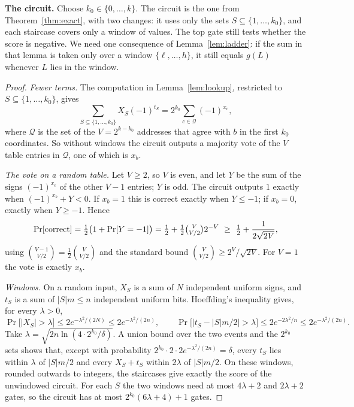 \documentclass[11pt,letterpaper]{article}
\theoremstyle{remark}
\newcommand{\smalltitle}[1]{\textbf{\color{ink}#1}\quad}
\begin{document}
\smalltitle{The circuit.}
Choose $k_0\in\{0,\dots,k\}$. The circuit is the one from
Theorem~\ref{thm:exact}, with two changes: it uses only the sets
$S\subseteq\{1,\dots,k_0\}$, and each staircase covers only a window of
values. The top gate still tests whether the score is negative. We need one
consequence of Lemma~\ref{lem:ladder}: if the sum in that lemma is taken only
over a window $\{\ell,\dots,h\}$, it still equals $g(L)$ whenever $L$ lies in
the window.

\begin{proof}
\emph{Fewer terms.} The computation in Lemma~\ref{lem:lookup}, restricted to
$S\subseteq\{1,\dots,k_0\}$, gives
\[
\sum_{S\subseteq\{1,\dots,k_0\}}X_S(-1)^{t_S}=2^{k_0}\sum_{c\in\mathcal Q}(-1)^{x_c},
\]
where $\mathcal Q$ is the set of the $V=2^{k-k_0}$ addresses that agree with
$b$ in the first $k_0$ coordinates. So without windows the circuit outputs a
majority vote of the $V$ table entries in $\mathcal Q$, one of which is
$x_b$.

\emph{The vote on a random table.} Let $V\ge2$, so $V$ is even, and let $Y$
be the sum of the signs $(-1)^{x_c}$ of the other $V-1$ entries; $Y$ is odd.
The circuit outputs $1$ exactly when $(-1)^{x_b}+Y<0$. If $x_b=1$ this is
correct exactly when $Y\le-1$; if $x_b=0$, exactly when $Y\ge-1$. Hence
\[
\Pr[\text{correct}]=\tfrac12\bigl(1+\Pr[Y=-1]\bigr)
=\tfrac12+\tfrac12\tbinom{V}{V/2}2^{-V}\ \ge\ \tfrac12+\frac1{2\sqrt{2V}},
\]
using $\binom{V-1}{V/2}=\tfrac12\binom{V}{V/2}$ and the standard bound
$\binom{V}{V/2}\ge2^V/\sqrt{2V}$. For $V=1$ the vote is exactly $x_b$.

\emph{Windows.} On a random input, $X_S$ is a sum of $N$ independent uniform
signs, and $t_S$ is a sum of $|S|m\le n$ independent uniform bits. Hoeffding's
inequality gives, for every $\lambda>0$,
\[
\Pr\bigl[|X_S|>\lambda\bigr]\le2e^{-\lambda^2/(2N)}\le2e^{-\lambda^2/(2n)},\qquad
\Pr\bigl[|t_S-|S|m/2|>\lambda\bigr]\le2e^{-2\lambda^2/n}\le2e^{-\lambda^2/(2n)}.
\]
Take $\lambda=\sqrt{2n\ln(4\cdot2^{k_0}/\delta)}$. A union bound over the two
events and the $2^{k_0}$ sets shows that, except with probability
$2^{k_0}\cdot2\cdot2e^{-\lambda^2/(2n)}=\delta$, every $t_S$ lies within
$\lambda$ of $|S|m/2$ and every $X_S+t_S$ within $2\lambda$ of $|S|m/2$. On
these windows, rounded outwards to integers, the staircases give exactly the
score of the unwindowed circuit. For each $S$ the two windows need at most
$4\lambda+2$ and $2\lambda+2$ gates, so the circuit has at most
$2^{k_0}(6\lambda+4)+1$ gates.


\end{proof}
\end{document}
